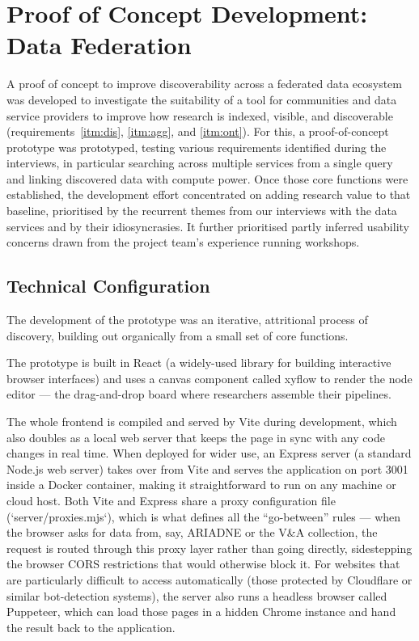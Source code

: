 \documentclass[11pt]{scrartcl}
\begin{document}
\section{Proof of Concept Development: Data Federation}

A proof of concept to improve discoverability across a federated data ecosystem was developed to investigate the suitability of a tool for communities and data service providers to improve how research is indexed, visible, and discoverable (requirements~\ref{itm:dis}, \ref{itm:agg}, and \ref{itm:ont}). For this, a proof-of-concept prototype was prototyped, testing various requirements identified during the interviews, in particular searching across multiple services from a single query and linking discovered data with compute power. Once those core functions were established, the development effort concentrated on adding research value to that baseline, prioritised by the recurrent themes from our interviews with the data services and by their idiosyncrasies. It further prioritised partly inferred usability concerns drawn from the project team's experience running workshops.

\subsection{Technical Configuration}
The development of the prototype was an iterative, attritional process of discovery, building out organically from a small set of core functions. 

The prototype is built in React (a widely-used library for building interactive browser interfaces) and uses a canvas component called xyflow to render the node editor — the drag-and-drop board where researchers assemble their pipelines. 

The whole frontend is compiled and served by Vite during development, which also doubles as a local web server that keeps the page in sync with any code changes in real time. When deployed for wider use, an Express server (a standard Node.js web server) takes over from Vite and serves the application on port 3001 inside a Docker container, making it straightforward to run on any machine or cloud host. Both Vite and Express share a proxy configuration file (`server/proxies.mjs`), which is what defines all the ``go-between'' rules — when the browser asks for data from, say, ARIADNE or the V\&A collection, the request is routed through this proxy layer rather than going directly, sidestepping the browser CORS restrictions that would otherwise block it. For websites that are particularly difficult to access automatically (those protected by Cloudflare or similar bot-detection systems), the server also runs a headless browser called Puppeteer, which can load those pages in a hidden Chrome instance and hand the result back to the application. 
\end{document}
